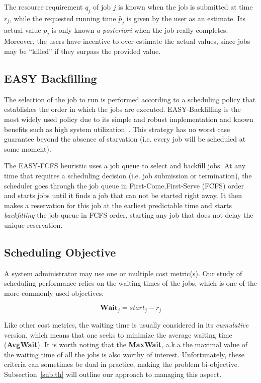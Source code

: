 \documentclass[sigconf]{acmart}
\begin{document}
The resource requirement $q_j$ of job $j$ is known when the job is submitted at
time $r_j$, while the requested running time $\widetilde{p_j}$ is given by the
user as an estimate. Its actual value $p_j$ is only known \textit{a posteriori}
when the job really completes.  Moreover, the users have incentive to
over-estimate the actual values, since jobs may be ``killed'' if they
surpass the provided value.
\subsection{EASY Backfilling}
\label{sub:easy}

The selection of the job to run is performed according to a
scheduling policy that establishes the order in which the jobs are executed.
EASY-Backfilling is the most widely used policy due to its simple and robust
implementation and known benefits such as high system
utilization~\cite{easy}. This strategy has no worst case guarantee beyond
the absence of starvation (i.e. every job will be scheduled at some moment).

The EASY-FCFS heuristic uses a job queue to select and backfill jobs.  At any
time that requires a scheduling decision (i.e. job submission or termination),
the scheduler goes through the job queue in First-Come,First-Serve (FCFS) order
and starts jobs until it finds a job that can not be started right away. It
then makes a reservation for this job at the earliest predictable time and
starts \textit{backfilling} the job queue in FCFS order, starting any job that
does not delay the unique reservation.

\subsection{Scheduling Objective}
\label{sub:scheduling_objectives}

A system administrator may use one or multiple cost metric(s). Our study of
scheduling performance relies on the waiting times of the jobs, which is one of
the more commonly used objectives.

    \begin{equation}
      \textbf{Wait}_j =  start_j-r_j
    \end{equation}

Like other cost metrics, the waiting time is usually considered in its
\textit{cumulative} version, which means that one seeks to minimize the average
waiting time (\textbf{AvgWait}). It is worth noting that the \textbf{MaxWait},
a.k.a the maximal value of the waiting time of all the jobs is also worthy of
interest. Unfortunately, these criteria can sometimes be dual in practice,
making the problem bi-objective. Subsection~\ref{sub:th} will outline our
approach to managing this aspect.
\end{document}
